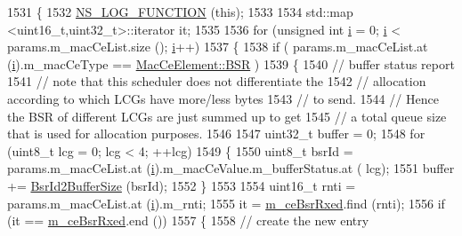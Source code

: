 \begin{DoxyCode}
1531 \{
1532         \hyperlink{log-macros-disabled_8h_a90b90d5bad1f39cb1b64923ea94c0761}{NS\_LOG\_FUNCTION} (\textcolor{keyword}{this});
1533 
1534         std::map <uint16\_t,uint32\_t>::iterator it;
1535 
1536         \textcolor{keywordflow}{for} (\textcolor{keywordtype}{unsigned} \textcolor{keywordtype}{int} \hyperlink{bernuolliDistribution_8m_a6f6ccfcf58b31cb6412107d9d5281426}{i} = 0; \hyperlink{bernuolliDistribution_8m_a6f6ccfcf58b31cb6412107d9d5281426}{i} < params.m\_macCeList.size (); \hyperlink{bernuolliDistribution_8m_a6f6ccfcf58b31cb6412107d9d5281426}{i}++)
1537         \{
1538                 \textcolor{keywordflow}{if} ( params.m\_macCeList.at (\hyperlink{bernuolliDistribution_8m_a6f6ccfcf58b31cb6412107d9d5281426}{i}).m\_macCeType == \hyperlink{structns3_1_1MacCeElement_a7b68183e7a7fd9b02783f92a2c645d7ba459101d6c51f15c22bfdf75d68f9c631}{MacCeElement::BSR} )
1539                 \{
1540                         \textcolor{comment}{// buffer status report}
1541                         \textcolor{comment}{// note that this scheduler does not differentiate the}
1542                         \textcolor{comment}{// allocation according to which LCGs have more/less bytes}
1543                         \textcolor{comment}{// to send.}
1544                         \textcolor{comment}{// Hence the BSR of different LCGs are just summed up to get}
1545                         \textcolor{comment}{// a total queue size that is used for allocation purposes.}
1546 
1547                         uint32\_t buffer = 0;
1548                         \textcolor{keywordflow}{for} (uint8\_t lcg = 0; lcg < 4; ++lcg)
1549                         \{
1550                                 uint8\_t bsrId = params.m\_macCeList.at (\hyperlink{bernuolliDistribution_8m_a6f6ccfcf58b31cb6412107d9d5281426}{i}).m\_macCeValue.m\_bufferStatus.at (
      lcg);
1551                                 buffer += \hyperlink{classns3_1_1MmWaveRrMacScheduler_ad748b4ad6a90547493f1bfd4a95fa055}{BsrId2BufferSize} (bsrId);
1552                         \}
1553 
1554                         uint16\_t rnti = params.m\_macCeList.at (\hyperlink{bernuolliDistribution_8m_a6f6ccfcf58b31cb6412107d9d5281426}{i}).m\_rnti;
1555                         it = \hyperlink{classns3_1_1MmWaveRrMacScheduler_a2ebec374f1ff5014f115ff8b68ff5ebb}{m\_ceBsrRxed}.find (rnti);
1556                         \textcolor{keywordflow}{if} (it == \hyperlink{classns3_1_1MmWaveRrMacScheduler_a2ebec374f1ff5014f115ff8b68ff5ebb}{m\_ceBsrRxed}.end ())
1557                         \{
1558                                 \textcolor{comment}{// create the new entry}

\end{DoxyCode}
